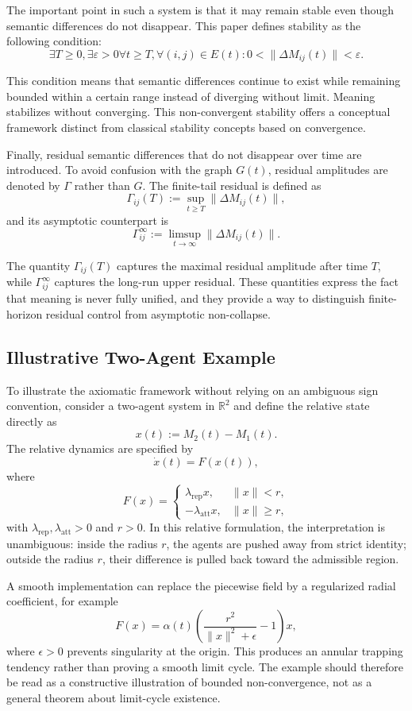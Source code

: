 \documentclass[11pt,a4paper]{article}
\theoremstyle{definition}
\begin{document}
The important point in such a system is that it may remain stable even though semantic differences do not disappear. This paper defines stability as the following condition:
\[
\exists T \geq 0, \exists \varepsilon > 0 \forall t \geq T, \forall (i,j) \in E(t) : 0 < \|\Delta M_{ij}(t)\| < \varepsilon.
\]

This condition means that semantic differences continue to exist while remaining bounded within a certain range instead of diverging without limit. Meaning stabilizes without converging. This non-convergent stability offers a conceptual framework distinct from classical stability concepts based on convergence.

Finally, residual semantic differences that do not disappear over time are introduced. To avoid confusion with the graph $G(t)$, residual amplitudes are denoted by $\Gamma$ rather than $G$. The finite-tail residual is defined as
\[
\Gamma_{ij}(T)
:=
\sup_{t \ge T}
\|\Delta M_{ij}(t)\|,
\]
and its asymptotic counterpart is
\[
\Gamma_{ij}^{\infty}
:=
\limsup_{t \to \infty}
\|\Delta M_{ij}(t)\|.
\]

The quantity $\Gamma_{ij}(T)$ captures the maximal residual amplitude after time $T$, while $\Gamma_{ij}^{\infty}$ captures the long-run upper residual. These quantities express the fact that meaning is never fully unified, and they provide a way to distinguish finite-horizon residual control from asymptotic non-collapse.


\subsection{Illustrative Two-Agent Example}

To illustrate the axiomatic framework without relying on an ambiguous sign convention, consider a two-agent system in $\mathbb{R}^2$ and define the relative state directly as
\[
x(t) := M_2(t)-M_1(t).
\]
The relative dynamics are specified by
\[
\dot{x}(t)=F(x(t)),
\]
where
\[
F(x)=
\begin{cases}
\lambda_{\mathrm{rep}}x, & \|x\|<r,\\
-\lambda_{\mathrm{att}}x, & \|x\|\geq r,
\end{cases}
\]
with $\lambda_{\mathrm{rep}},\lambda_{\mathrm{att}}>0$ and $r>0$. In this relative formulation, the interpretation is unambiguous: inside the radius $r$, the agents are pushed away from strict identity; outside the radius $r$, their difference is pulled back toward the admissible region.

A smooth implementation can replace the piecewise field by a regularized radial coefficient, for example
\[
F(x)=\alpha(t)\left(\frac{r^2}{\|x\|^2+\epsilon}-1\right)x,
\]
where $\epsilon>0$ prevents singularity at the origin. This produces an annular trapping tendency rather than proving a smooth limit cycle. The example should therefore be read as a constructive illustration of bounded non-convergence, not as a general theorem about limit-cycle existence.
\end{document}
